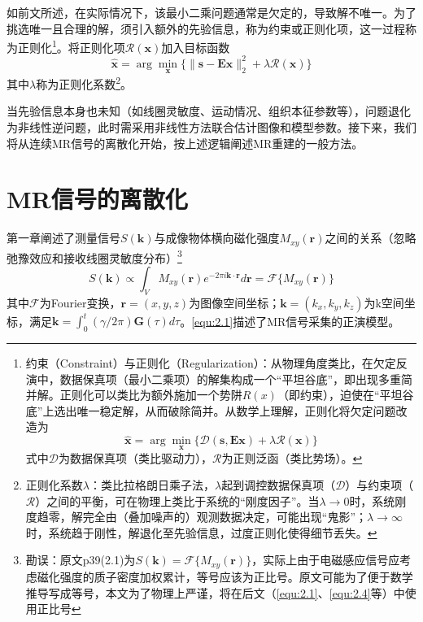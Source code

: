 \documentclass[12pt]{article}
\begin{document}
如前文所述，在实际情况下，该最小二乘问题通常是欠定的，导致解不唯一。为了挑选唯一且合理的解，须引入额外的先验信息，称为约束或正则化项，这一过程称为正则化\footnote{约束（Constraint）与正则化（Regularization）：从物理角度类比，在欠定反演中，数据保真项（最小二乘项）的解集构成一个“平坦谷底”，即出现多重简并解。正则化可以类比为额外施加一个势阱$R(x)$（即约束），迫使在“平坦谷底”上选出唯一稳定解，从而破除简并。从数学上理解，正则化将欠定问题改造为
\begin{equation}
    \hat{\bm{x}}=\arg\min_{\bm{x}}\{\mathcal{D}(\bm{s},\mathbf{E}\bm{x})+\lambda \mathcal{R}(\bm{x})\}
\end{equation}
式中$\mathcal{D}$为数据保真项（类比驱动力），$\mathcal{R}$为正则泛函（类比势场）。}。将正则化项$\mathcal{R}(\bm{x})$加入目标函数
\begin{equation}
    \hat{\bm{x}}=\arg\min_{\bm{x}}\{\|\bm{s}-\mathbf{E}\bm{x}\|_2^2+\lambda\mathcal{R}(\bm{x})\}
\end{equation}
其中$\lambda$称为正则化系数\footnote{正则化系数$\lambda$：类比拉格朗日乘子法，$\lambda$起到调控数据保真项（$\mathcal{D}$）与约束项（$\mathcal{R}$）之间的平衡，可在物理上类比于系统的“刚度因子”。当$\lambda\to0$时，系统刚度趋零，解完全由（叠加噪声的）观测数据决定，可能出现“鬼影”；$\lambda\to\infty$ 时，系统趋于刚性，解退化至先验信息，过度正则化使得细节丢失。}。

当先验信息本身也未知（如线圈灵敏度、运动情况、组织本征参数等），问题退化为非线性逆问题，此时需采用非线性方法联合估计图像和模型参数。接下来，我们将从连续MR信号的离散化开始，按上述逻辑阐述MR重建的一般方法。

\section{MR信号的离散化}
第一章阐述了测量信号$S(\bm{k})$与成像物体横向磁化强度$M_{xy}(\bm{r})$之间的关系（忽略弛豫效应和接收线圈灵敏度分布）\footnote{勘误：原文p39(2.1)为$S(\bm{k})=\mathcal{F}\{M_{xy}(\bm{r})\}$，实际上由于电磁感应信号应考虑磁化强度的质子密度加权累计，等号应该为正比号。原文可能为了便于数学推导写成等号，本文为了物理上严谨，将在后文（\autoref{equ:2.1}、\autoref{equ:2.4}等）中使用正比号}
\begin{equation}
    S(\bm{k})\propto\int_{V} M_{xy}(\bm{r})e^{-2\pi i\bm{k}\cdot\bm{r}} d\bm{r}=\mathcal{F}\{M_{xy}(\bm{r})\}
    \label{equ:2.1}
\end{equation}
其中$\mathcal{F}$为Fourier变换，$\bm{r}=(x,y,z)$为图像空间坐标；$\bm{k}=(k_x,k_y,k_z)$为k空间坐标，满足$\bm{k}=\int_{0}^{t}(\gamma/2\pi)\bm{G}(\tau) d\tau$。\autoref{equ:2.1}描述了MR信号采集的正演模型。
\end{document}
